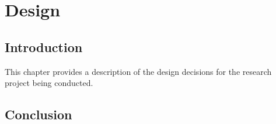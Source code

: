 \chapter{Design}

\section{Introduction}
This chapter provides a description of the design decisions for the research project being conducted.  

\section{Conclusion}
